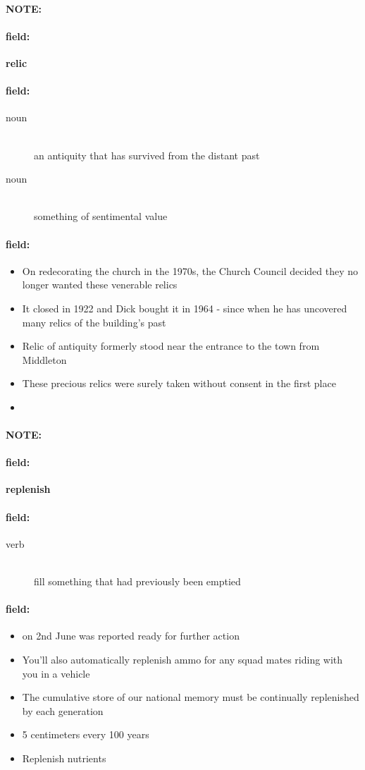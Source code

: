 \documentclass[12pt]{article}
\newenvironment{note}{\paragraph{NOTE:}}{}
\newenvironment{field}{\paragraph{field:}}{}
\begin{document}
\begin{note}
\begin{field}
\textbf{\large relic}
\end{field}


\begin{field}
\begin{description}
\item[noun] \hfill \\ 
an antiquity that has survived from the distant past

\item[noun] \hfill \\ 
something of sentimental value

\end{description}
\end{field}

\begin{field}
\begin{itemize}
\item On redecorating the church in the 1970s, the Church Council decided they no longer wanted these venerable relics
\item It closed in 1922 and Dick bought it in 1964 - since when he has uncovered many relics of the building's past
\item Relic of antiquity formerly stood near the entrance to the town from Middleton
\item These precious relics were surely taken without consent in the first place
\item 
\end{itemize}
\end{field}
\end{note}
\begin{note}
\begin{field}
\textbf{\large replenish}
\end{field}


\begin{field}
\begin{description}
\item[verb] \hfill \\ 
fill something that had previously been emptied

\end{description}
\end{field}

\begin{field}
\begin{itemize}
\item  on 2nd June was reported ready for further action
\item You'll also automatically replenish ammo for any squad mates riding with you in a vehicle
\item The cumulative store of our national memory must be continually replenished by each generation
\item 5 centimeters every 100 years
\item Replenish nutrients
\end{itemize}
\end{field}
\end{note}
\end{document}
